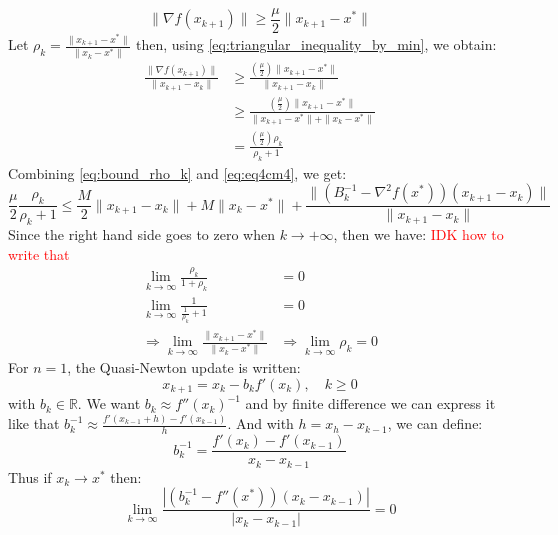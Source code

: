 \documentclass[12pt, openany]{report}
\newcommand{\R}{\mathbb{R}}
\theoremstyle{definition}
\begin{document}
\begin{equation}\label{eq:bound_norm_hessian}
	\|\nabla f(x_{k+1})\| \geq \frac{\mu}{2} \|x_{k+1}-x^*\|
\end{equation}
Let $\rho_k = \frac{\|x_{k+1}-x^*\|}{\|x_k-x^*\|}$ then, using \eqref{eq:triangular_inequality_by_min}, we obtain:
\begin{equation}\label{eq:bound_rho_k}
	\begin{aligned}
		\frac{\|\nabla f(x_{k+1})\|}{\|x_{k+1}-x_k\|} &\geq \frac{(\frac{\mu}{2})\|x_{k+1}-x^*\|}{\|x_{k+1}-x_k\|}\\
		&\geq \frac{(\frac{\mu}{2})\|x_{k+1}-x^*\|}{\|x_{k+1}-x^*\| + \|x_k-x^*\|}\\
		&= \frac{(\frac{\mu}{2}) \rho_k}{\rho_k + 1}
	\end{aligned}
\end{equation}
Combining \eqref{eq:bound_rho_k} and \eqref{eq:eq4cm4}, we get:
\begin{equation}
	\frac{\mu}{2} \frac{\rho_k}{\rho_k + 1} \leq \frac{M}{2} \|x_{k+1}-x_k\| + M \|x_k-x^*\| + \frac{\|\left(B^{-1}_k - \nabla^2f(x^*)\right) (x_{k+1}-x_k)\|}{\|x_{k+1}-x_k\|}
\end{equation}
Since the right hand side goes to zero when $k \to +\infty$, then we have:
\textcolor{red}{IDK how to write that}
\begin{equation}
	\begin{aligned}
		\lim_{k \to \infty} \frac{\rho_k}{1 + \rho_k} &= 0\\
		\lim_{k \to \infty} \frac{1}{\frac{1}{\rho_k} + 1} &= 0\\
		\Rightarrow \lim_{k \to \infty} \frac{\|x_{k+1}-x^*\|}{\|x_k-x^*\|} &\Rightarrow \lim_{k \to \infty} \rho_k = 0  
	\end{aligned}
\end{equation}
For $n=1$, the Quasi-Newton update is written:
\begin{equation}
	x_{k+1}=x_k-b_kf'(x_k), \quad k \geq 0
\end{equation}
with $b_k \in \R$. We want $b_k \approx f''(x_k)^{-1}$ and by finite difference we can express it like that $b_k^{-1} \approx \frac{f'(x_{k-1}+h)-f'(x_{k-1})}{h}$. And with $h = x_h-x_{k-1}$, we can define:
\begin{equation}\label{eq:def_b_k_1D}
	b_k^{-1} = \frac{f'(x_k)-f'(x_{k-1})}{x_{k}-x_{k-1}}
\end{equation}
Thus if $x_k \to x^*$ then:
\begin{equation}
	\lim_{k \to \infty} \frac{|(b_k^{-1}-f''(x^*))(x_k-x_{k-1})|}{|x_k-x_{k-1}|} = 0
\end{equation}
\end{document}
